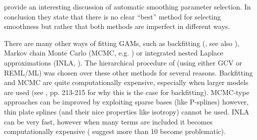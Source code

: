 
 provide an interesting discussion of automatic smoothing parameter selection. In conclusion they state that there is no clear ``best'' method for selecting smoothness but rather that both methods are imperfect in different ways. 




There are many other ways of fitting GAMs, such as backfitting (\cite{gammonograph}, see also ), Markov chain Monte Carlo (MCMC, e.g. \cite{fahrmeir2004}) or integrated nested Laplace approximations (INLA, \cite{inla}). The hierarchical procedure of  (using either GCV or REML/ML) was chosen over these other methods for several reasons. Backfitting and MCMC are quite computationally expensive, especially when larger models are used (see \cite{simonbook}, pp. 213-215 for why this is the case for backfitting). MCMC-type approaches can be improved by exploiting sparse bases (like P-splines) however, thin plate splines (and their nice properties like isotropy) cannot be used. INLA can be very fast, however when many terms are included it becomes computationally expensive (\cite{inla} suggest more than 10 become problematic).

